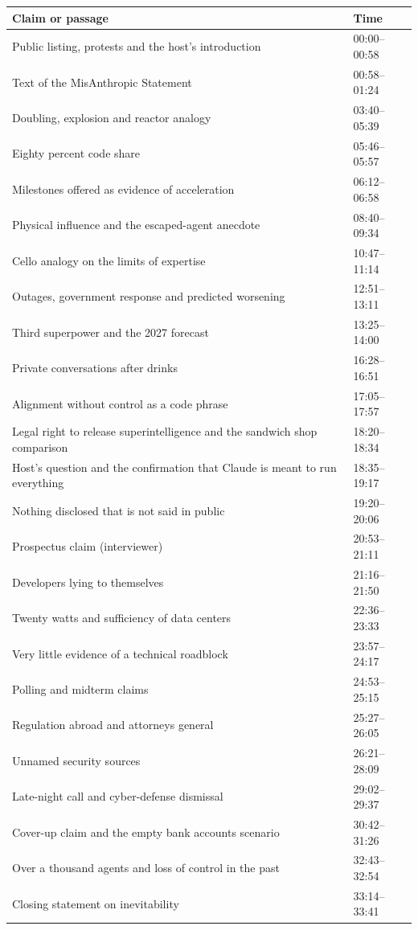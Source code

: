\documentclass[11pt]{article}
\begin{document}
{\small
\renewcommand{\arraystretch}{1.2}
\begin{longtable}{@{}p{}p{}@{}}
\toprule
Claim or passage & Time \\
\midrule
\endhead
\bottomrule
\endfoot
Public listing, protests and the host's introduction & 00:00--00:58 \\
Text of the MisAnthropic Statement & 00:58--01:24 \\
Doubling, explosion and reactor analogy & 03:40--05:39 \\
Eighty percent code share & 05:46--05:57 \\
Milestones offered as evidence of acceleration & 06:12--06:58 \\
Physical influence and the escaped-agent anecdote & 08:40--09:34 \\
Cello analogy on the limits of expertise & 10:47--11:14 \\
Outages, government response and predicted worsening & 12:51--13:11 \\
Third superpower and the 2027 forecast & 13:25--14:00 \\
Private conversations after drinks & 16:28--16:51 \\
Alignment without control as a code phrase & 17:05--17:57 \\
Legal right to release superintelligence and the sandwich shop comparison & 18:20--18:34 \\
Host's question and the confirmation that Claude is meant to run everything & 18:35--19:17 \\
Nothing disclosed that is not said in public & 19:20--20:06 \\
Prospectus claim (interviewer) & 20:53--21:11 \\
Developers lying to themselves & 21:16--21:50 \\
Twenty watts and sufficiency of data centers & 22:36--23:33 \\
Very little evidence of a technical roadblock & 23:57--24:17 \\
Polling and midterm claims & 24:53--25:15 \\
Regulation abroad and attorneys general & 25:27--26:05 \\
Unnamed security sources & 26:21--28:09 \\
Late-night call and cyber-defense dismissal & 29:02--29:37 \\
Cover-up claim and the empty bank accounts scenario & 30:42--31:26 \\
Over a thousand agents and loss of control in the past & 32:43--32:54 \\
Closing statement on inevitability & 33:14--33:41 \\
\end{longtable}
}
\end{document}

